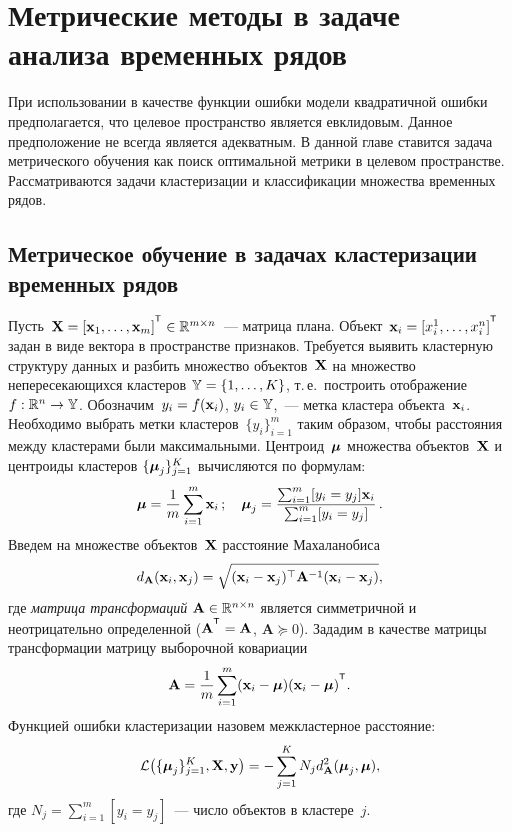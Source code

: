 \chapter{Метрические методы в задаче анализа временных рядов}
\label{ch:metric_learning}

При использовании в качестве функции ошибки модели квадратичной ошибки предполагается, что целевое пространство является евклидовым. 
Данное предположение не всегда является адекватным.
В данной главе ставится задача метрического обучения как поиск оптимальной метрики в целевом пространстве.
Рассматриваются задачи кластеризации и классификации множества временных рядов.

\section{Метрическое обучение в задачах кластеризации временных рядов}
\label{sec:ch5:metric_learning_clustering}

Пусть~$\bX = [\bx_1, \dots, \bx_m]^{\T} \in \mathbb{R}^{m \times n}$~--- матрица плана.
Объект~$\bx_i = [x_i^1, \ldots, x_i^n]^{\T}$ задан в виде вектора в пространстве признаков.
Требуется выявить кластерную структуру данных и разбить множество объектов~$\mathbf{X}$ на множество непересекающихся кластеров $\mathbb{Y} = \{1, \dots, K\}$,
т.\,е.\ построить отображение $f: \mathbb{R}^n \to \mathbb{Y}$.
Обозначим~$y_i = f (\mathbf{x}_i)$, $y_i \in \mathbb{Y}$,~--- метка кластера объекта~$\mathbf{x}_i$.
Необходимо выбрать метки кластеров~$\{y_i\}_{i=1}^m$ таким образом, чтобы расстояния между кластерами были максимальными.
Центроид~$\boldsymbol{\mu}$ множества объектов~$\mathbf{X}$ и центроиды кластеров $\{\boldsymbol{\mu}_j\}_{j=1}^K$ вычисляются по формулам:
\begin{equation}
	\label{ch5:eq:mu}
	\boldsymbol{\mu} =\frac{1}{m} \sum_{i=1}^m\mathbf{x}_i\,; \quad
	\boldsymbol{\mu}_j =\frac{ \sum_{i=1}^m [y_i = y_j]\mathbf{x}_i } {\sum_{i=1}^m [y_i = y_j]}\,.
\end{equation}
Введем на множестве объектов~$\mathbf{X}$ расстояние Махаланобиса
\begin{equation}
	d_{\mathbf{A}} (\mathbf{x}_i, \mathbf{x}_j) = \sqrt{(\mathbf{x}_i - \mathbf{x}_j)^{\top} \mathbf{A}^{-1} (\mathbf{x}_i - \mathbf{x}_j)},
	\label{ch5:eq:mahal_distance}
\end{equation}
где \textit{матрица трансформаций} $\mathbf{A} \in \mathbb{R}^{n \times n}$ является симметричной и неотрицательно определенной ($\mathbf{A}^{\T} = \mathbf{A}$, $\mathbf{A} \succeq 0$).
Зададим в качестве матрицы трансформации матрицу выборочной ковариации
\begin{equation}
	\label{ch5:eq:covMatrix}
	\bA = \frac{1}{m} \sum_{i=1}^m(\bx_i - \bmu)(\bx_i - \bmu)^{\T}.
\end{equation}
Функцией ошибки кластеризации назовем межкластерное расстояние:
\begin{equation}
	\mathcal{L} \bigl(\{\boldsymbol{\mu}_j\}_{j=1}^K, \mathbf{X}, \mathbf{y}\bigr)= - \sum_{j=1}^K N_j d_{\mathbf{A}}^2(\boldsymbol{\mu}_j, \boldsymbol{\mu}),
	\label{ch5:eq:cluster_error_function}
\end{equation}
где $N_j = \sum_{i=1}^m [y_i = y_j]$~--- число объектов в кластере~$j$.

